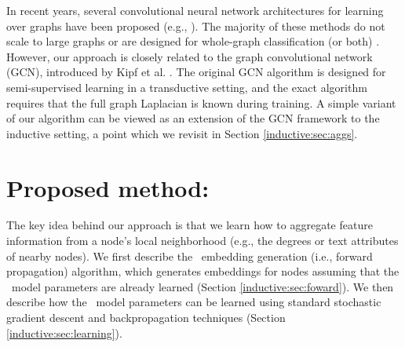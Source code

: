 In recent years, several convolutional neural network architectures for learning over graphs have been proposed (e.g., \cite{bruna2013spectral,duvenaud2015convolutional,
defferrard2016convolutional,kipf2016semi,niepert2016learning}).
The majority of these methods do not scale to large graphs or are designed for whole-graph classification (or both) \cite{bruna2013spectral,duvenaud2015convolutional,
defferrard2016convolutional,niepert2016learning}.
However, our approach is closely related to the graph convolutional network (GCN), introduced by Kipf et al. \cite{kipf2016semi,kipf2016variational}. 
The original GCN algorithm \cite{kipf2016semi} is designed for semi-supervised learning in a transductive setting, and the exact algorithm requires that the full graph Laplacian is known during training. 
A simple variant of our algorithm can be viewed as an extension of the GCN framework to the inductive setting, a point which we revisit in Section \ref{inductive:sec:aggs}. 


\section{Proposed method: \name}


The key idea behind our approach is that we learn how to aggregate feature information from a node's local neighborhood (e.g., the degrees or text attributes of nearby nodes). 
We first describe the  \name\ embedding generation (i.e., forward propagation) algorithm, which generates embeddings for nodes assuming that the \name\ model parameters are already learned (Section \ref{inductive:sec:foward}). 
We then describe how the \name\ model parameters can be learned using standard stochastic gradient descent and backpropagation techniques (Section \ref{inductive:sec:learning}). 

